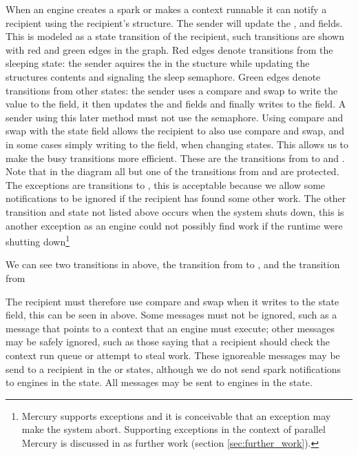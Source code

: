 When an engine creates a spark or makes a context runnable
it can notify a recipient using the recipient's
\enginesleepsync structure.
The sender will update the ,  and
 fields.
This is modeled as a state transition of the recipient,
such transitions are shown with red and green edges in the graph.
Red edges denote transitions from the sleeping state:
the sender aquires the  in the
\enginesleepsync stucture while updating the structures contents and
signaling the sleep semaphore. 
Green edges denote transitions from other states:
the sender uses a compare and swap to write the  value to the
 field,
it then updates the  and  fields
and finally writes  to the  field.
A sender using this later method must not use the semaphore.
Using compare and swap with the state field allows the recipient to also
use compare and swap, and in some cases simply writing to the field,
when changing states.
This allows us to make the busy transitions more efficient.
These are the transitions from 
 to
 and 
.
Note that in the diagram all but one of the transitions from
 and 
are protected.
The exceptions are transitions to ,
this is acceptable because we allow some notifications to be ignored if the
recipient has found some other work.
The other transition and state not listed above occurs when the system shuts
down,
this is another exception as an engine could not possibly find work if the
runtime were shutting down\footnote{
    Mercury supports exceptions and it is conceivable that an exception may
    make the system abort.
    Supporting exceptions in the context of parallel Mercury is discussed in
    as further work (section \ref{sec:further_work}).
}

We can see two transitions in \idle above,
the transition from  to ,
and the transition from 

The recipient must therefore use compare and swap when it writes to the
state field,
this can be seen in \idle above.
Some messages must not be ignored, such as a message that points to a
context that an engine must execute;
other messages may be safely ignored, such as those saying that a recipient
should check the context run queue or attempt to steal work.
These ignoreable messages may be send to a recipient in the  or
 states,
although we do not send spark notifications to engines in the
 state.
All messages may be sent to engines in the  state.

